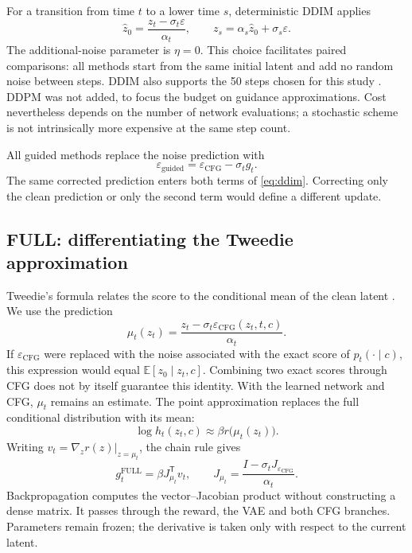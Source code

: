 \documentclass[11pt,a4paper]{article}
\newcommand{\E}{\mathbb{E}}
\begin{document}
For a transition from time $t$ to a lower time $s$, deterministic DDIM applies
\begin{equation}\label{eq:ddim}
\widehat z_0=\frac{z_t-\sigma_t\varepsilon}{\alpha_t},
\qquad z_s=\alpha_s\widehat z_0+\sigma_s\varepsilon.
\end{equation}
The additional-noise parameter is $\eta=0$. This choice facilitates paired comparisons: all methods start from the same initial latent and add no random noise between steps. DDIM also supports the 50 steps chosen for this study \cite{ddim}. DDPM was not added, to focus the budget on guidance approximations. Cost nevertheless depends on the number of network evaluations; a stochastic scheme is not intrinsically more expensive at the same step count.

All guided methods replace the noise prediction with
\begin{equation}\label{eq:noise}
\varepsilon_{\mathrm{guided}}=\varepsilon_{\mathrm{CFG}}-\sigma_tg_t.
\end{equation}
The same corrected prediction enters both terms of \eqref{eq:ddim}. Correcting only the clean prediction or only the second term would define a different update.

\subsection{FULL: differentiating the Tweedie approximation}
Tweedie's formula relates the score to the conditional mean of the clean latent \cite{efron}. We use the prediction
\begin{equation}\label{eq:mu}
\mu_t(z_t)=\frac{z_t-\sigma_t\varepsilon_{\mathrm{CFG}}(z_t,t,c)}{\alpha_t}.
\end{equation}
If $\varepsilon_{\mathrm{CFG}}$ were replaced with the noise associated with the exact score of $p_t(\cdot\mid c)$, this expression would equal $\E[z_0\mid z_t,c]$. Combining two exact scores through CFG does not by itself guarantee this identity. With the learned network and CFG, $\mu_t$ remains an estimate. The point approximation replaces the full conditional distribution with its mean:
\begin{equation}\label{eq:tweedie}
\log h_t(z_t,c)\approx\beta r\bigl(\mu_t(z_t)\bigr).
\end{equation}
Writing $v_t=\nabla_zr(z)|_{z=\mu_t}$, the chain rule gives
\begin{equation}\label{eq:full}
g_t^{\mathrm{FULL}}=\beta J_{\mu_t}^{\mathsf T}v_t,
\qquad J_{\mu_t}=\frac{I-\sigma_tJ_{\varepsilon_{\mathrm{CFG}}}}{\alpha_t}.
\end{equation}
Backpropagation computes the vector--Jacobian product without constructing a dense matrix. It passes through the reward, the VAE and both CFG branches. Parameters remain frozen; the derivative is taken only with respect to the current latent.
\end{document}
